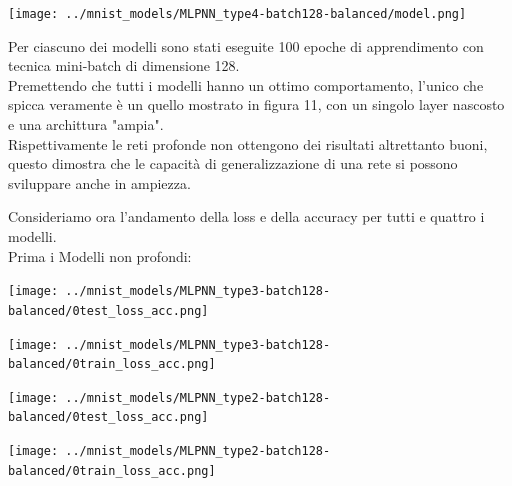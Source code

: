 \documentclass[12pt]{article}
\begin{document}
\begin{multicols}{3}
    \noindent
    \begin{minipage}{\linewidth}
        \centering
        \texttt{[image: ../mnist\_models/MLPNN\_type4-batch128-balanced/model.png]}
        \label{fig:cc}
    \end{minipage}
    \bigskip

\end{multicols}
Per ciascuno dei modelli sono stati eseguite 100 epoche di apprendimento
con tecnica mini-batch di dimensione 128.\\


Premettendo che tutti i modelli hanno un ottimo comportamento, l'unico 
che spicca veramente è un quello mostrato in figura 11, con un singolo
layer nascosto e una archittura "ampia".\\

Rispettivamente le reti profonde non ottengono dei risultati altrettanto buoni,
questo dimostra che le capacità di generalizzazione di una rete si possono
sviluppare anche in ampiezza.

Consideriamo ora l'andamento della loss e della accuracy per tutti e quattro i modelli.\\
Prima i Modelli non profondi:

\begin{multicols}{2}
    \noindent
    \begin{minipage}{\linewidth}
        \centering
        \texttt{[image: ../mnist\_models/MLPNN\_type3-batch128-balanced/0test\_loss\_acc.png]}
        \label{fig:cc}
    \end{minipage}
    \bigskip

    \noindent
    \begin{minipage}{\linewidth}
        \centering
        \texttt{[image: ../mnist\_models/MLPNN\_type3-batch128-balanced/0train\_loss\_acc.png]}
        \label{fig:cc}
    \end{minipage}
    \bigskip
\end{multicols}

\begin{multicols}{2}
    \noindent
    \begin{minipage}{\linewidth}
        \centering
        \texttt{[image: ../mnist\_models/MLPNN\_type2-batch128-balanced/0test\_loss\_acc.png]}
        \label{fig:cc}
    \end{minipage}
    \bigskip

    \noindent
    \begin{minipage}{\linewidth}
        \centering
        \texttt{[image: ../mnist\_models/MLPNN\_type2-batch128-balanced/0train\_loss\_acc.png]}
        \label{fig:cc}
    \end{minipage}
    \bigskip
\end{multicols}
\end{document}

